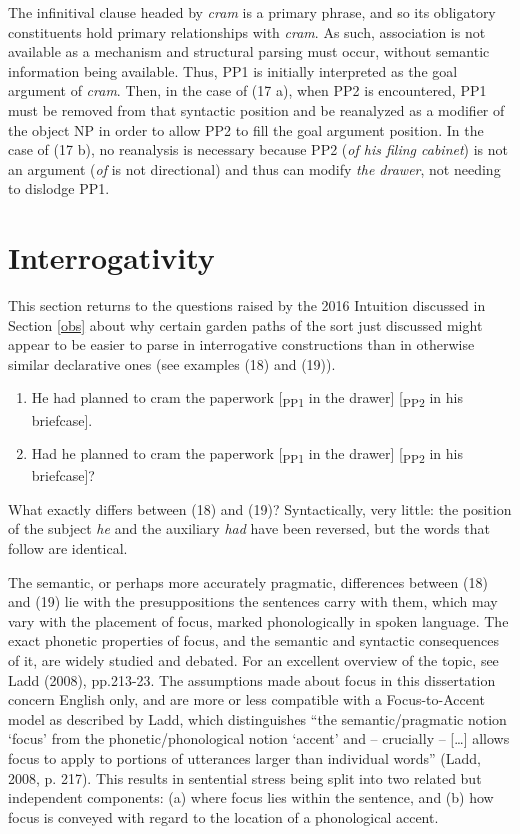 \documentclass[11pt,oneside]{book}
\providecommand{\tightlist}{%
  \setlength{\itemsep}{0pt}\setlength{\parskip}{0pt}}
\begin{document}
The infinitival clause headed by \emph{cram} is a primary phrase, and so its obligatory constituents hold primary relationships with \emph{cram}. As such, association is not available as a mechanism and structural parsing must occur, without semantic information being available. Thus, PP1 is initially interpreted as the goal argument of \emph{cram}. Then, in the case of (17 a), when PP2 is encountered, PP1 must be removed from that syntactic position and be reanalyzed as a modifier of the object NP in order to allow PP2 to fill the goal argument position. In the case of (17 b), no reanalysis is necessary because PP2 (\emph{of his filing cabinet}) is not an argument (\emph{of} is not directional) and thus can modify \emph{the drawer}, not needing to dislodge PP1.

\hypertarget{intg}{%
\section{Interrogativity}\label{intg}}

This section returns to the questions raised by the 2016 Intuition discussed in Section \ref{obs} about why certain garden paths of the sort just discussed might appear to be easier to parse in interrogative constructions than in otherwise similar declarative ones (see examples (18) and (19)).

\begin{enumerate}
\def\labelenumi{(\arabic{enumi})}
\setcounter{enumi}{17}
\tightlist
\item
  He had planned to cram the paperwork {[}\textsubscript{PP1} in the drawer{]} {[}\textsubscript{PP2} in his briefcase{]}.
\item
  Had he planned to cram the paperwork {[}\textsubscript{PP1} in the drawer{]} {[}\textsubscript{PP2} in his briefcase{]}?
\end{enumerate}

What exactly differs between (18) and (19)? Syntactically, very little: the position of the subject \emph{he} and the auxiliary \emph{had} have been reversed, but the words that follow are identical.

The semantic, or perhaps more accurately pragmatic, differences between (18) and (19) lie with the presuppositions the sentences carry with them, which may vary with the placement of focus, marked phonologically in spoken language. The exact phonetic properties of focus, and the semantic and syntactic consequences of it, are widely studied and debated. For an excellent overview of the topic, see Ladd (2008), pp.213-23. The assumptions made about focus in this dissertation concern English only, and are more or less compatible with a Focus-to-Accent model as described by Ladd, which distinguishes ``the semantic/pragmatic notion `focus' from the phonetic/phonological notion `accent' and -- crucially -- {[}\ldots{}{]} allows focus to apply to portions of utterances larger than individual words'' (Ladd, 2008, p. 217). This results in sentential stress being split into two related but independent components: (a) where focus lies within the sentence, and (b) how focus is conveyed with regard to the location of a phonological accent.
\end{document}
